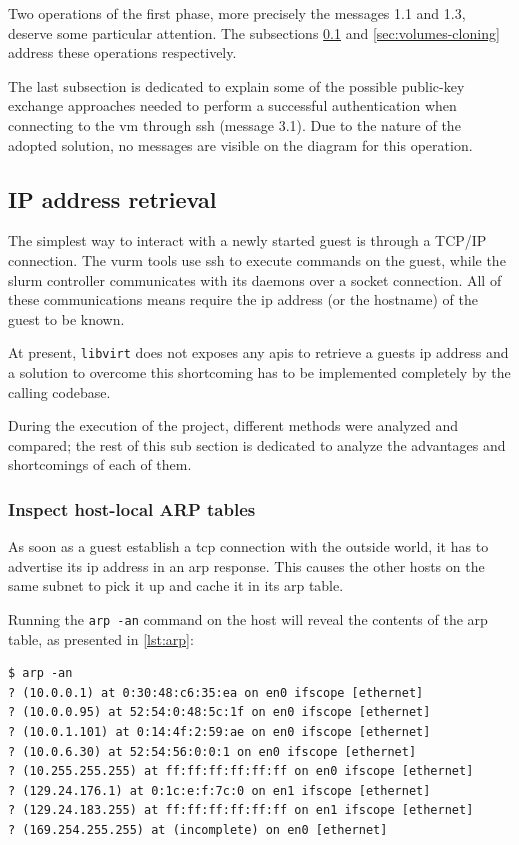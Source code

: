 Two operations of the first phase, more precisely the messages 1.1 and 1.3, deserve some particular attention. The subsections \ref{sec:ip-address-retrieval} and \ref{sec:volumes-cloning} address these operations respectively.

The last subsection is dedicated to explain some of the possible public-key exchange approaches needed to perform a successful authentication when connecting to the \gls{vm} through \gls{ssh} (message 3.1). Due to the nature of the adopted solution, no messages are visible on the diagram for this operation.


\subsection{IP address retrieval}
\label{sec:ip-address-retrieval}

The simplest way to interact with a newly started guest is through a TCP/IP connection. The \gls{vurm} tools use \gls{ssh} to execute commands on the guest, while the \gls{slurm} controller communicates with its daemons over a socket connection. All of these communications means require the \gls{ip} address (or the hostname) of the guest to be known.

At present, \texttt{libvirt} does not exposes any \glspl{api} to retrieve a guests \gls{ip} address and a solution to overcome this shortcoming has to be implemented completely by the calling codebase.

During the execution of the project, different methods were analyzed and compared; the rest of this sub section is dedicated to analyze the advantages and shortcomings of each of them.

\subsubsection{Inspect host-local ARP tables}

As soon as a guest establish a \gls{tcp} connection with the outside world, it has to advertise its \gls{ip} address in an \gls{arp} response. This causes the other hosts on the same subnet to pick it up and cache it in its \gls{arp} table.

Running the \texttt{arp -an} command on the host will reveal the contents of the \gls{arp} table, as presented in \autoref{lst:arp}:

\begin{lstlisting}
$ arp -an
? (10.0.0.1) at 0:30:48:c6:35:ea on en0 ifscope [ethernet]
? (10.0.0.95) at 52:54:0:48:5c:1f on en0 ifscope [ethernet]
? (10.0.1.101) at 0:14:4f:2:59:ae on en0 ifscope [ethernet]
? (10.0.6.30) at 52:54:56:0:0:1 on en0 ifscope [ethernet]
? (10.255.255.255) at ff:ff:ff:ff:ff:ff on en0 ifscope [ethernet]
? (129.24.176.1) at 0:1c:e:f:7c:0 on en1 ifscope [ethernet]
? (129.24.183.255) at ff:ff:ff:ff:ff:ff on en1 ifscope [ethernet]
? (169.254.255.255) at (incomplete) on en0 [ethernet]
\end{lstlisting}


